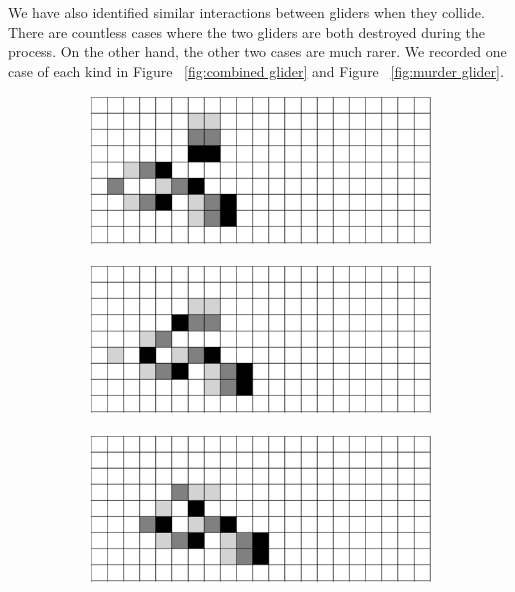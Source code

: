 \documentclass[12pt]{article}
\numberwithin{figure}{section} %
\begin{document}
We have also identified similar interactions between gliders when they collide. There are countless cases where the two gliders are both destroyed during the process. On the other hand, the other two cases are much rarer. We recorded one case of each kind in Figure ~\ref{fig:combined glider} and Figure ~\ref{fig:murder glider}. 

\begin{figure}[H]
	\begin{subfigure}{0.45\textwidth}
     	\includegraphics[width=\linewidth]{Section4/35.0}
     	\subcaption{}
   	\end{subfigure}
    	\begin{subfigure}{0.45\textwidth}
     	\includegraphics[width=\linewidth]{Section4/35.1}
     	\subcaption{}
   	\end{subfigure}
	\newline
	\begin{subfigure}{0.45\textwidth}
     	\includegraphics[width=\linewidth]{Section4/35.2}

\end{subfigure}
\end{figure}
\end{document}
